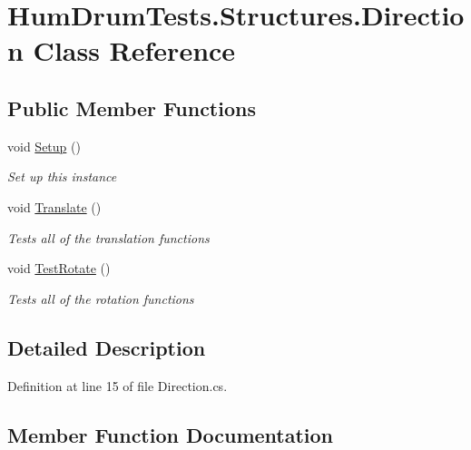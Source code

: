 \hypertarget{classHumDrumTests_1_1Structures_1_1Direction}{}\section{Hum\+Drum\+Tests.\+Structures.\+Direction Class Reference}
\label{classHumDrumTests_1_1Structures_1_1Direction}
\subsection*{Public Member Functions}
\begin{DoxyCompactItemize}
\item 
void \hyperlink{classHumDrumTests_1_1Structures_1_1Direction_af5763d1a155e6c6893e2ebaad7d9d28e}{Setup} ()
\begin{DoxyCompactList}\small\item\em Set up this instance \end{DoxyCompactList}\item 
void \hyperlink{classHumDrumTests_1_1Structures_1_1Direction_a1b8e0fed4d838e73f06d95b55cd87018}{Translate} ()
\begin{DoxyCompactList}\small\item\em Tests all of the translation functions \end{DoxyCompactList}\item 
void \hyperlink{classHumDrumTests_1_1Structures_1_1Direction_a5e015b9599db14e7a1eb7a94622351bb}{Test\+Rotate} ()
\begin{DoxyCompactList}\small\item\em Tests all of the rotation functions \end{DoxyCompactList}\end{DoxyCompactItemize}


\subsection{Detailed Description}


Definition at line 15 of file Direction.\+cs.



\subsection{Member Function Documentation}
